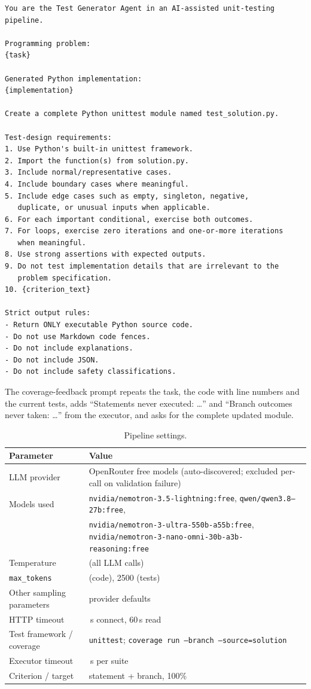 \documentclass[11pt,a4paper]{article}
\begin{document}
\begin{lstlisting}[caption={Test Generator prompt. Item 10 depends on the chosen criterion; for \texttt{statement+branch} it is ``Aim for high statement and branch coverage.''}]
You are the Test Generator Agent in an AI-assisted unit-testing pipeline.

Programming problem:
{task}

Generated Python implementation:
{implementation}

Create a complete Python unittest module named test_solution.py.

Test-design requirements:
1. Use Python's built-in unittest framework.
2. Import the function(s) from solution.py.
3. Include normal/representative cases.
4. Include boundary cases where meaningful.
5. Include edge cases such as empty, singleton, negative,
   duplicate, or unusual inputs when applicable.
6. For each important conditional, exercise both outcomes.
7. For loops, exercise zero iterations and one-or-more iterations
   when meaningful.
8. Use strong assertions with expected outputs.
9. Do not test implementation details that are irrelevant to the
   problem specification.
10. {criterion_text}

Strict output rules:
- Return ONLY executable Python source code.
- Do not use Markdown code fences.
- Do not include explanations.
- Do not include JSON.
- Do not include safety classifications.
\end{lstlisting}

The coverage-feedback prompt repeats the task, the code with line numbers and the
current tests, adds ``Statements never executed: \ldots'' and ``Branch outcomes never
taken: \ldots'' from the executor, and asks for the complete updated module.

\begin{table}[H]
\centering\small
\begin{tabularx}{\linewidth}{l >{\raggedright\arraybackslash}X}
\toprule
Parameter & Value\\
\midrule
LLM provider & OpenRouter free models (auto-discovered; excluded per-call on validation failure)\\
Models used & \texttt{nvidia/nemotron-3.5-lightning:free}, \texttt{qwen/qwen3.8--27b:free},\\
            & \texttt{nvidia/nemotron-3-ultra-550b-a55b:free}, \texttt{nvidia/nemotron-3-nano-omni-30b-a3b-reasoning:free}\\
Temperature & 0.2 (all LLM calls)\\
\texttt{max\_tokens} & 1500 (code), 2500 (tests)\\
Other sampling parameters & provider defaults\\
HTTP timeout & 10\,s connect, 60\,s read\\
Test framework / coverage & \texttt{unittest}; \texttt{coverage run --branch --source=solution}\\
Executor timeout & 180\,s per suite\\
Criterion / target & statement + branch, 100\%\\
\bottomrule
\end{tabularx}
\caption{Pipeline settings.}
\end{table}
\end{document}
